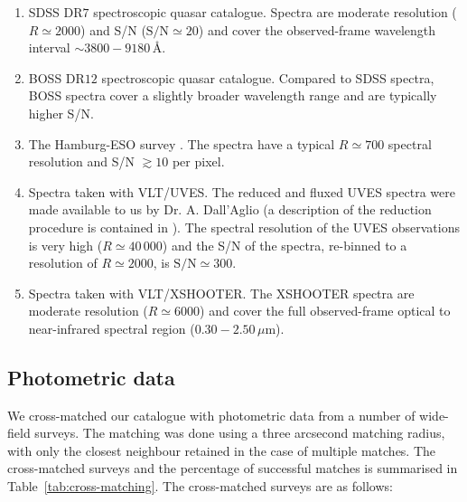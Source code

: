 \begin{enumerate}

 \item SDSS DR$7$ spectroscopic quasar catalogue. Spectra are moderate resolution ($R\simeq2000$) and S/N ($\text{S/N}\simeq20$) and cover the observed-frame wavelength interval $\sim3800-9180$\,\AA.   
 
 \item BOSS DR$12$ \citep{paris17} spectroscopic quasar catalogue. Compared to SDSS spectra, BOSS spectra cover a slightly broader wavelength range and are typically higher S/N. 

 \item The Hamburg-ESO survey \citep{wisotzki00}. The spectra have a typical $R\simeq700$ spectral resolution and S/N $\gtrsim10$ per pixel. 

 \item Spectra taken with VLT/UVES. The reduced and fluxed UVES spectra were made available to us by Dr. A. Dall'Aglio (a description of the reduction procedure is contained in \citealt{dallaglio08}). The spectral resolution of the UVES observations is very high ($R\simeq40\,000$) and the S/N of the spectra, re-binned to a resolution of $R\simeq2000$, is $\text{S/N}\simeq300$. 

 \item Spectra taken with VLT/XSHOOTER. The XSHOOTER spectra are moderate resolution ($R\simeq6000$) and cover the full observed-frame optical to near-infrared spectral region ($0.30-2.50$\,$\mu$m). 

\end{enumerate}

\subsection{Photometric data}

We cross-matched our catalogue with photometric data from a number of wide-field surveys. 
The matching was done using a three arcsecond matching radius, with only the closest neighbour retained in the case of multiple matches. 
The cross-matched surveys and the percentage of successful matches is summarised in Table~\ref{tab:cross-matching}. 
The cross-matched surveys are as follows:

